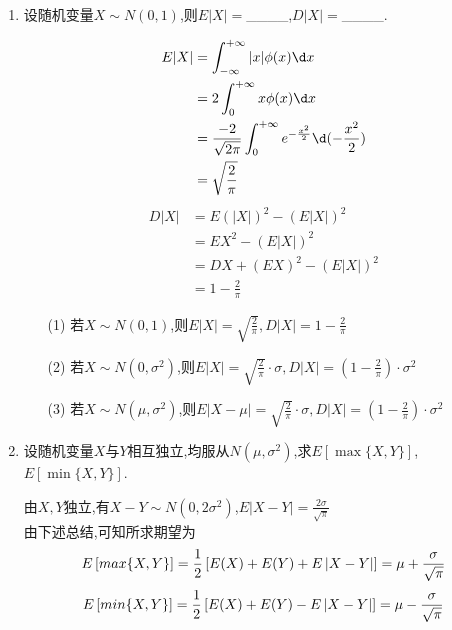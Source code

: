 \documentclass[12pt, a4paper, oneside, UTF8]{ctexbook}
\begin{document}
\begin{enumerate}[label=\arabic*.]
    \item 设随机变量$X\sim N(0,1)$,则$E|X|=$\_\_\_\_,$D|X|=$\_\_\_\_.
    
    \begin{solution}
    \begin{align*}
        E|X| &=\int_{-\infty}^{+\infty}|x|\phi(x)\d x \\
        &=2\int_{0}^{+\infty}x\phi(x)\d x \\
        &=\frac{-2}{\sqrt{2\pi}}\int_{0}^{+\infty}e^{-\frac{x^2}{2}}\d (-\frac{x^2}{2}) \\
        &=\sqrt{\frac{2}{\pi}}
    \end{align*}
    \begin{align*}
        D|X| &=E(|X|)^2-(E|X|)^2 \\
        &=EX^2-(E|X|)^2 \\
        &=DX+(EX)^2-(E|X|)^2 \\
        &=1-\frac{2}{\pi}
    \end{align*}
    \end{solution}
    
    \begin{tcolorbox}[title=总结]
        \begin{enumerate}
            \item [(1)] 若$X\sim N(0,1)$,则$E|X|=\sqrt{\frac{2}{\pi}},D|X|=1-\frac{2}{\pi}$
            \item [(2)] 若$X\sim N(0,\sigma^2)$,则$E|X|=\sqrt{\frac{2}{\pi}}\cdot\sigma,D|X|=(1-\frac{2}{\pi})\cdot\sigma^2$
            \item [(3)] 若$X\sim N(\mu,\sigma^2)$,则$E|X-\mu|=\sqrt{\frac{2}{\pi}}\cdot\sigma,D|X|=(1-\frac{2}{\pi})\cdot\sigma^2$
        \end{enumerate}
    \end{tcolorbox}
    \item 设随机变量$X$与$Y$相互独立,均服从$N(\mu,\sigma^2)$,求$E[\max\{X,Y\}]$,$E[\min\{X,Y\}]$.
    
    \begin{solution}
    由$X,Y$独立,有$X-Y\sim N(0,2\sigma^2)$,$E\left|X-Y\right|=\frac{2\sigma}{\sqrt{\pi}}$ \\
    由下述总结,可知所求期望为
    \[
    E\left[max\{X,Y\}\right]=\frac{1}{2}\left[E(X)+E(Y)+E\left|X-Y\right|\right] = \mu + \frac{\sigma}{\sqrt{\pi}} \\
    \]
    \[
    E\left[min\{X,Y\}\right]=\frac{1}{2}\left[E(X)+E(Y)-E\left|X-Y\right|\right] = \mu - \frac{\sigma}{\sqrt{\pi}} \\
    \]
    \end{solution}
    

\end{enumerate}
\end{document}
